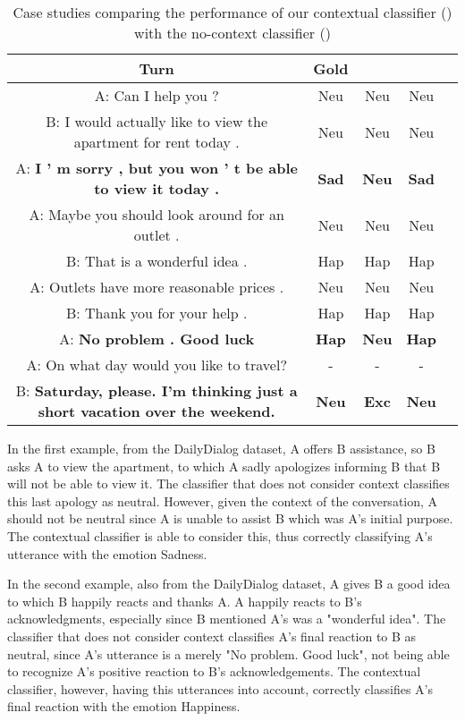 \documentclass[11pt]{article}
\begin{document}
\begin{table*}[htpb]
 \centering
 \caption{Case studies comparing the performance of our contextual classifier () with the no-context classifier ()}
  \begin{tabular}{ccccc}
    \hline
       Turn & Gold &  & \\
      \hline
      A: Can I help you ? & Neu& Neu&Neu \\
      B: I would actually like to view the apartment for rent today .& Neu& Neu &Neu \\
      A: \textbf{I ’ m sorry , but you won ’ t be able to view it today .}& \textbf{Sad}& \textbf{Neu} & \textbf{Sad}\\
       \hline 
      
      A: Maybe you should look around for an outlet .& Neu&Neu&Neu\\
      B: That is a wonderful idea . &Hap&Hap&Hap\\
    A: Outlets have more reasonable prices . &Neu&Neu&Neu\\
    B: Thank you for your help .& Hap&Hap&Hap\\
    A: \textbf{No problem . Good luck} &\textbf{Hap}&\textbf{Neu}&\textbf{Hap}\\
    \hline
      A: On what day would you like to travel? &- & - & -\\
      B: \textbf{Saturday, please. I'm thinking just a short vacation over the weekend.}&  \textbf{Neu} &  \textbf{Exc} &  \textbf{Neu}\\
 

    
    \hline
  \end{tabular} 
 \label{tcsdd}
\end{table*} 


In the first example, from the DailyDialog dataset, A offers B assistance, so B asks A to view the apartment, to which A sadly apologizes informing B that B will not be able to view it. The classifier that does not consider context classifies this last apology as neutral. However, given the context of the conversation, A should not be neutral since A is unable to assist B which was A's initial purpose. The contextual classifier is able to consider this, thus correctly classifying A's utterance with the emotion Sadness.  

In the second example, also from the DailyDialog dataset, A gives B a good idea to which B happily reacts and thanks A. A happily reacts to B's acknowledgments, especially since B mentioned A's was a "wonderful idea". The classifier that does not consider context classifies A's final reaction to B as neutral, since A's utterance is a merely "No problem. Good luck", not being able to recognize A's positive reaction to B's acknowledgements. The contextual classifier, however, having this utterances into account, correctly classifies A's final reaction with the emotion Happiness.
\end{document}
